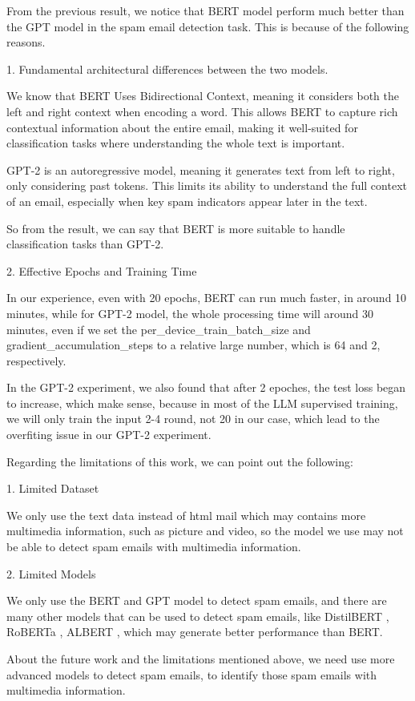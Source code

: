 
From the previous result, we notice that BERT model perform much better than the GPT model in the spam email detection task. 
This is because of the following reasons.

1. Fundamental architectural differences between the two models.

We know that BERT Uses Bidirectional Context, meaning it considers both the left and right 
context when encoding a word. This allows BERT to capture rich contextual information about the entire email, making it well-suited for classification tasks where understanding the whole text is important.

GPT-2 is an autoregressive model, meaning it generates text from left to right, only considering past tokens. 
This limits its ability to understand the full context of an email, especially when key spam indicators appear later in the text.

So from the result, we can say that BERT is more suitable to handle classification tasks than GPT-2.

2. Effective Epochs and Training Time

In our experience, even with 20 epochs, BERT can run much faster, in around 10 minutes, while for GPT-2 model, the whole processing time will around 30 minutes, even if we set the per\_device\_train\_batch\_size and gradient\_accumulation\_steps to a relative large number, which is 64 and 2, respectively.

In the GPT-2 experiment, we also found that after 2 epoches, the test loss began to increase, which make sense, because in most of the LLM supervised training, we will only train the input 2-4 round, not 20 in our case, which lead to the overfiting issue in our GPT-2 experiment.

Regarding the limitations of this work, we can point out the following:

1. Limited Dataset

We only use the text data instead of html mail which may contains more multimedia information, such as picture and video, so the model we use may not be able to detect spam emails with multimedia information.

2. Limited Models

We only use the BERT and GPT model to detect spam emails, and there are many other models that can be used to detect spam emails, like DistilBERT \cite{sanh2019distilbert}, RoBERTa \cite{liu2019roberta}, ALBERT \cite{lan2019albert}, which may generate better performance than BERT.

About the future work and the limitations mentioned above, we need use more advanced models to detect spam emails, to identify those spam emails with multimedia information. 








